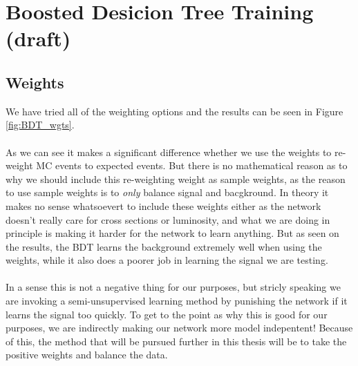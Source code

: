 \documentclass[12pt, a4paper]{book}
\begin{document}
\section{Boosted Desicion Tree Training (draft)}
\subsection{Weights}
We have tried all of the weighting options and the results can be seen in Figure \ref{fig:BDT_wgts}.\\
\\As we can see it makes a significant difference whether we use the weights to re-weight MC events to expected events. But there is no mathematical reason as to why we should 
include this re-weighting weight as sample weights, as the reason to use sample weights is to \textit{only} balance signal and bacgkround. In theory it makes no sense whatsoevert to include these weights either 
as the network doesn't really care for cross sections or luminosity, and what we are doing in principle is making it harder for the network to learn anything. But as seen on the results, the BDT learns the background 
extremely well when using the weights, while it also does a poorer job in learning the signal we are testing.\\ 
\\In a sense this is not a negative thing for our purposes, but stricly speaking we are invoking a semi-unsupervised learning method by punishing the network if it learns the signal too quickly. 
To get to the point as why this is good for our purposes, we are indirectly making our network more model indepentent! Because of this, the method that will be pursued further in this thesis will be to 
take the positive weights and balance the data.
\end{document}
